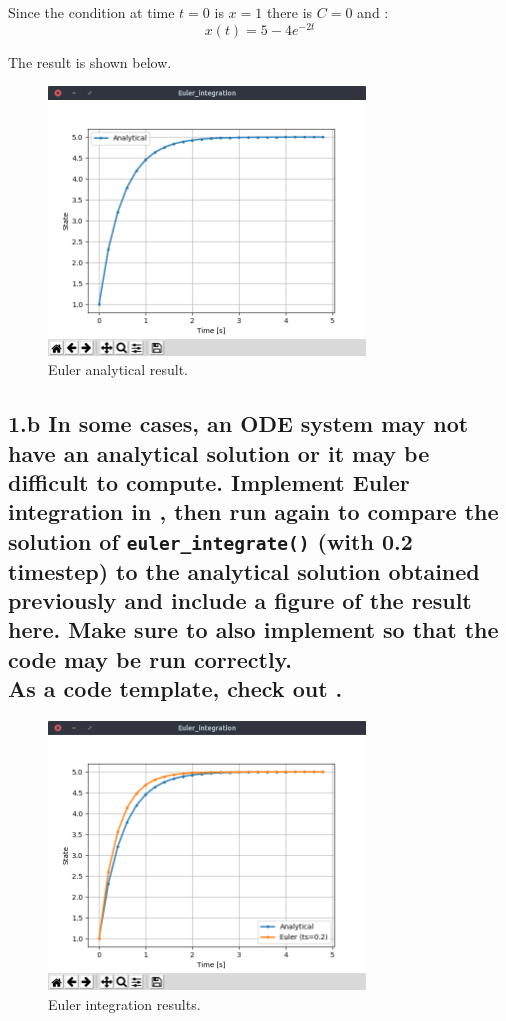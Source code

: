 \documentclass{cmc}
\begin{document}
Since the condition at time $t = 0$ is $x=1$ there is $C=0$ and :
$$x(t) = 5 - 4e^{-2t}$$

The result is shown below.

\begin{figure}[H]
  	\centering
  	\includegraphics[width=0.75\textwidth,trim={0 1.25cm 0 0},clip]{figures/ex1_euler_analytical.png}
  	\caption{Euler analytical result.}
  	\label{fig:euler_analytical}
\end{figure}

\subsection*{1.b In some cases, an ODE system may not have an analytical
  solution or it may be difficult to compute. Implement Euler integration in
  , %
  then run  again to compare the solution of
  \texttt{eu\-ler\_integr\-ate()} (with 0.2 timestep) %
  to the analytical solution obtained previously and include a figure of the
  result here. Make sure to also implement
  so that the code may be run correctly. \\ As a code template, check out
  .}

\begin{figure}[H]
  	\centering
  	\includegraphics[width=0.75\textwidth,trim={0 1.25cm 0 0},clip]{figures/ex1_euler_integration.png}
  	\caption{Euler integration results.}
  	\label{fig:euler_integration}
\end{figure}
\end{document}
